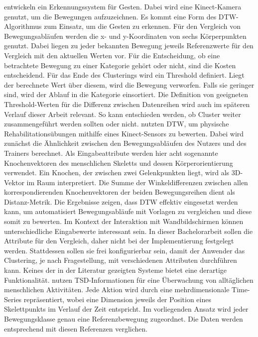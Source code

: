 \citet{wahyuni_motion_2021} entwickeln ein Erkennungssystem für Gesten.
Dabei wird eine Kinect-Kamera genutzt, um die Bewegungen aufzuzeichnen.
Es kommt eine Form des \ac{DTW}-Algorithmus zum Einsatz, um die Gesten zu erkennen.
Für den Vergleich von Bewegungsabläufen werden die x- und y-Koordinaten von sechs Körperpunkten genutzt.
Dabei liegen zu jeder bekannten Bewegung jeweils Referenzwerte für den Vergleich mit den aktuellen Werten vor.
Für die Entscheidung, ob eine betrachtete Bewegung zu einer Kategorie gehört oder nicht, sind die Kosten entscheidend.
Für das Ende des Clusterings wird ein Threshold definiert.
Liegt der berechnete Wert über diesem, wird die Bewegung verworfen.
Falls sie geringer sind, wird der Ablauf in die Kategorie einsortiert.
Die Definition von geeigneten Threshold-Werten für die Differenz zwischen Datenreihen
wird auch im späteren Verlauf dieser Arbeit relevant.
So kann entschieden werden, ob Cluster weiter zusammengeführt werden sollten oder nicht.
\citet{yu_dynamic_2019} nutzten \ac{DTW}, um physische Rehabilitationsübungen mithilfe eines Kinect-Sensors zu bewerten.
Dabei wird zunächst die Ähnlichkeit zwischen den Bewegungsabläufen des Nutzers und des Trainers berechnet.
Als Eingabeattribute werden hier acht sogenannte Knochenvektoren des menschlichen Skeletts und dessen Körperorientierung verwendet.
Ein Knochen, der zwischen zwei Gelenkpunkten liegt, wird als 3D-Vektor im Raum interpretiert.
Die Summe der Winkeldifferenzen zwischen allen korrespondierenden Knochenvektoren der beiden Bewegungsreihen dient
als Distanz-Metrik.
Die Ergebnisse zeigen, dass \ac{DTW} effektiv eingesetzt werden kann,
um automatisiert Bewegungsabläufe mit Vorlagen zu vergleichen und diese somit zu bewerten.
Im Kontext der Interaktion mit Wandbildschirmen können unterschiedliche Eingabewerte interessant sein.
In dieser Bachelorarbeit sollen die Attribute für den Vergleich, daher nicht bei der Implementierung festgelegt werden.
Stattdessen sollen sie frei konfigurierbar sein,
damit der Anwender das Clustering, je nach Fragestellung, mit verschiedenen Attributen durchführen kann.
Keines der in der Literatur gezeigten Systeme bietet eine derartige Funktionalität.
\citet{mohammadzade_dynamic_2021} nutzen \ac{TSD}-Informationen für eine Überwachung von alltäglichen menschlichen Aktivitäten.
Jede Aktion wird durch eine mehrdimensionale Time-Series repräsentiert,
wobei eine Dimension jeweils der Position eines Skelettpunkts im Verlauf der Zeit entspricht.
Im vorliegenden Ansatz wird jeder Bewegungsklasse genau eine Referenzbewegung zugeordnet.
Die Daten werden entsprechend mit diesen Referenzen verglichen.
